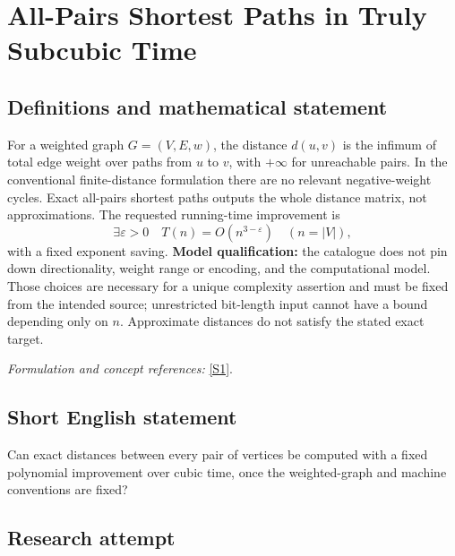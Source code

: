 \documentclass[11pt,a4paper]{article}
\newcommand{\eps}{\varepsilon}
\newcommand{\sref}[2]{\hyperlink{source:#1:#2}{[S#2]}}
\newif\ifshowcatalogue
\newcommand{\cataloguescope}[1]{\ifshowcatalogue
 \paragraph{Exact scope in the supplied catalogue.}
 \begin{quote}\small #1\end{quote}\fi}
\numberwithin{equation}{section}
\begin{document}
\setcounter{section}{231}
\clearpage
\section{\texorpdfstring{All-Pairs Shortest Paths in Truly Subcubic Time}{All-Pairs Shortest Paths in Truly Subcubic Time}}\label{232}
\subsection{Definitions and mathematical statement}
For a weighted graph $G=(V,E,w)$, the distance $d(u,v)$ is the infimum of total edge weight over paths from $u$ to $v$, with $+\infty$ for unreachable pairs. In the conventional finite-distance formulation there are no relevant negative-weight cycles. Exact all-pairs shortest paths outputs the whole distance matrix, not approximations. The requested running-time improvement is
\[
 \exists\eps>0\quad T(n)=O(n^{3-\eps})\quad(n=|V|),
\]
with a fixed exponent saving. \textbf{Model qualification:} the catalogue does not pin down directionality, weight range or encoding, and the computational model. Those choices are necessary for a unique complexity assertion and must be fixed from the intended source; unrestricted bit-length input cannot have a bound depending only on $n$. Approximate distances do not satisfy the stated exact target.
\par\smallskip\textit{Formulation and concept references:} \sref{232}{1}.
\cataloguescope{Determine whether exact all-pairs shortest paths on weighted n-vertex graphs can be computed in O(n\textasciicircum{}(3-epsilon)) time for some fixed epsilon greater than zero.}
\subsection{Short English statement}
Can exact distances between every pair of vertices be computed with a fixed polynomial improvement over cubic time, once the weighted-graph and machine conventions are fixed?
\subsection{Research attempt}
\end{document}
